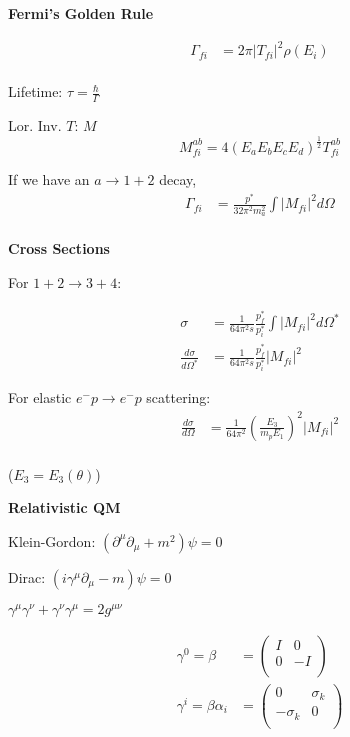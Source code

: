 \documentclass[10pt,letterpaper]{article}
\renewcommand{\d}{\partial}
\newcommand{\0}{\mathcal{O}}
\begin{document}
\begin{multicols}{3}
\textbf{Fermi's Golden Rule}

\begin{align*}
    \Gamma_{fi} &= 2\pi |T_{fi}|^2 \rho(E_i) \\
\end{align*}

Lifetime: $\tau = \frac{\hbar}{\Gamma}$

Lor. Inv. $T$: $M$
$$M_{fi}^{ab} = 4(E_aE_bE_cE_d)^{\frac{1}{2}}T_{fi}^{ab}$$

If we have an $a \to 1 + 2$ decay,
\begin{align*}
    \Gamma_{fi} &= \frac{p^*}{32\pi^2m_a^2} \int |M_{fi}|^2 d\Omega \\
\end{align*}

\textbf{Cross Sections}

For $1+2 \to 3+4$:

\begin{align*}
    \sigma &= \frac{1}{64\pi^2 s} \frac{p_f^*}{p_i^*} \int |M_{fi}|^2 d\Omega^*\\
    \frac{d\sigma}{d\Omega^*} &= \frac{1}{64\pi^2 s} \frac{p_f^*}{p_i^*} |M_{fi}|^2
\end{align*}

For elastic $e^- p \to e^- p$ scattering:
\begin{align*}
    \frac{d\sigma}{d\Omega} &= \frac{1}{64\pi^2} \left(\frac{E_3}{m_p E_1}\right)^2 |M_{fi}|^2 \\
\end{align*}

($E_3 = E_3(\theta)$)

\textbf{Relativistic QM}

Klein-Gordon: $(\d^\mu\d_\mu + m^2)\psi = 0$

Dirac: $(i\gamma^\mu \d_\mu - m)\psi = 0$

$\gamma^\mu\gamma^\nu + \gamma^\nu\gamma^\mu = 2g^{\mu\nu}$

\begin{align*}
    \gamma^0 = \beta &= \begin{pmatrix}
        I & 0 \\
        0 & -I \\
    \end{pmatrix} \\
    \gamma^i = \beta\alpha_i &= \begin{pmatrix}
        0 & \sigma_k \\
        -\sigma_k & 0 \\
    \end{pmatrix} \\
\end{align*}


\end{multicols}
\end{document}
